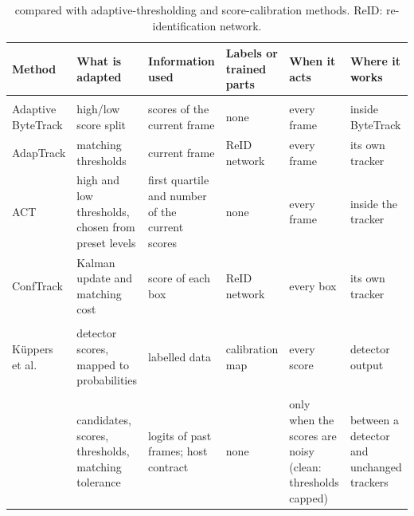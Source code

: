 \begin{table}[!tp]
\caption{\scl{} compared with adaptive-thresholding and score-calibration methods. ReID:
re-identification network.}
\label{tab:compare}
\centering\footnotesize
\setlength{\tabcolsep}{3pt}
\begin{tabular}{@{}>{\raggedright\arraybackslash}p{23mm}>{\raggedright\arraybackslash}p{28mm}>{\raggedright\arraybackslash}p{28mm}>{\raggedright\arraybackslash}p{19mm}>{\raggedright\arraybackslash}p{24mm}>{\raggedright\arraybackslash}p{25mm}@{}}
\toprule
Method & What is adapted & Information used & Labels or trained parts & When it acts & Where it works\\
\midrule
\multicolumn{6}{@{}l}{\textit{Adaptive thresholding}}\\
Adaptive ByteTrack \cite{ma2023adaptivebytetrack} & high/low score split & scores of the current frame & none & every frame & inside ByteTrack\\
AdapTrack \cite{shim2024adaptrack} & matching thresholds & current frame & ReID network & every frame & its own tracker\\
ACT \cite{act2026adaptive} & high and low thresholds, chosen from preset levels & first quartile and number of the current scores & none & every frame & inside the tracker\\
ConfTrack \cite{jung2024conftrack} & Kalman update and matching cost & score of each box & ReID network & every box & its own tracker\\
\addlinespace[3pt]
\multicolumn{6}{@{}l}{\textit{Score calibration}}\\
K{\"u}ppers et al.\ \cite{kuppers2020detcalib} & detector scores, mapped to probabilities & labelled data & calibration map & every score & detector output\\
\addlinespace[3pt]
\multicolumn{6}{@{}l}{\textit{This paper}}\\
\scl{} & candidates, scores, thresholds, matching tolerance & logits of past frames; host contract & none & only when the scores are noisy (clean: thresholds capped) & between a detector and unchanged trackers\\
\bottomrule
\end{tabular}
\end{table}
